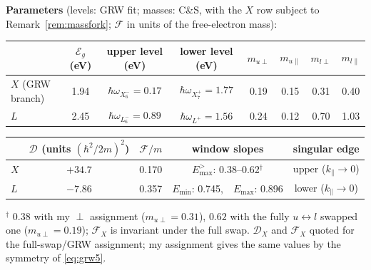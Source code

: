 \documentclass[11pt,a4paper]{article}
\numberwithin{equation}{section}
\newcommand{\cD}{\mathcal{D}}
\newcommand{\cF}{\mathcal{F}}
\newcommand{\kpar}{k_{\parallel}}
\newcommand{\wXsix}{\hbar\omega_{X_6^-}}
\newcommand{\wXseven}{\hbar\omega_{X_7^+}}
\newcommand{\wLsix}{\hbar\omega_{L_6^-}}
\newcommand{\wLplus}{\hbar\omega_{L^+}}
\begin{document}
\medskip
\noindent\textbf{Parameters} (levels: GRW fit; masses: C\&S, with the
$X$ row subject to Remark~\ref{rem:massfork}; $\cF$ in units of the
free-electron mass):
\begin{center}
\begin{tabular}{lccccccc}
\toprule
 & $\mathcal{E}_g$ (eV) & upper level (eV) & lower level (eV)
 & $m_{u\perp}$ & $m_{u\parallel}$ & $m_{l\perp}$ & $m_{l\parallel}$\\
\midrule
$X$ (GRW branch) & 1.94 & $\wXsix=0.17$ & $\wXseven=1.77$
 & 0.19 & 0.15 & 0.31 & 0.40\\
$L$ & 2.45 & $\wLsix=0.89$ & $\wLplus=1.56$
 & 0.24 & 0.12 & 0.70 & 1.03\\
\bottomrule
\end{tabular}

\medskip
\begin{tabular}{lcccc}
\toprule
 & $\cD$ (units $(\hbar^2/2m)^2$) & $\cF/m$ & window slopes & singular edge\\
\midrule
$X$ & $+34.7$ & 0.170 & $E_{\max}^{>}$: 0.38--0.62$^{\dagger}$
 & upper ($\kpar\to0$)\\
$L$ & $-7.86$ & 0.357 & $E_{\min}$: 0.745,\ \ $E_{\max}$: 0.896
 & lower ($\kpar\to0$)\\
\bottomrule
\end{tabular}
\end{center}
{\footnotesize $^{\dagger}$ $0.38$ with my $\perp$ assignment
($m_{u\perp}=0.31$), $0.62$ with the fully $u\leftrightarrow l$
swapped one ($m_{u\perp}=0.19$); $\cF_X$ is invariant under the full
swap. $\cD_X$ and $\cF_X$ quoted for the full-swap/GRW assignment;
my assignment gives the same values by the symmetry of
\eqref{eq:grw5}.}
\end{document}
